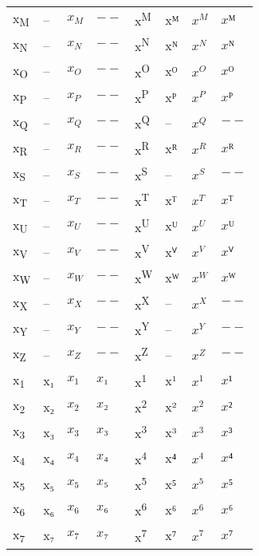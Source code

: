 \documentclass{standalone}
\begin{document}
\begin{tabular}{ll|ll|ll|ll}
x\textsubscript{M} & -- & $x_{M}$ & $--$ & x\textsuperscript{M} & xᴹ & $x^{M}$ & $xᴹ$ \\
x\textsubscript{N} & -- & $x_{N}$ & $--$ & x\textsuperscript{N} & xᴺ & $x^{N}$ & $xᴺ$ \\
x\textsubscript{O} & -- & $x_{O}$ & $--$ & x\textsuperscript{O} & xᴼ & $x^{O}$ & $xᴼ$ \\
x\textsubscript{P} & -- & $x_{P}$ & $--$ & x\textsuperscript{P} & xᴾ & $x^{P}$ & $xᴾ$ \\
x\textsubscript{Q} & -- & $x_{Q}$ & $--$ & x\textsuperscript{Q} & -- & $x^{Q}$ & $--$ \\
x\textsubscript{R} & -- & $x_{R}$ & $--$ & x\textsuperscript{R} & xᴿ & $x^{R}$ & $xᴿ$ \\
x\textsubscript{S} & -- & $x_{S}$ & $--$ & x\textsuperscript{S} & -- & $x^{S}$ & $--$ \\
x\textsubscript{T} & -- & $x_{T}$ & $--$ & x\textsuperscript{T} & xᵀ & $x^{T}$ & $xᵀ$ \\
x\textsubscript{U} & -- & $x_{U}$ & $--$ & x\textsuperscript{U} & xᵁ & $x^{U}$ & $xᵁ$ \\
x\textsubscript{V} & -- & $x_{V}$ & $--$ & x\textsuperscript{V} & xⱽ & $x^{V}$ & $xⱽ$ \\
x\textsubscript{W} & -- & $x_{W}$ & $--$ & x\textsuperscript{W} & xᵂ & $x^{W}$ & $xᵂ$ \\
x\textsubscript{X} & -- & $x_{X}$ & $--$ & x\textsuperscript{X} & -- & $x^{X}$ & $--$ \\
x\textsubscript{Y} & -- & $x_{Y}$ & $--$ & x\textsuperscript{Y} & -- & $x^{Y}$ & $--$ \\
x\textsubscript{Z} & -- & $x_{Z}$ & $--$ & x\textsuperscript{Z} & -- & $x^{Z}$ & $--$ \\
\midrule
x\textsubscript{1} & x₁ & $x_{1}$ & $x₁$ & x\textsuperscript{1} & x¹ & $x^{1}$ & $x¹$ \\
x\textsubscript{2} & x₂ & $x_{2}$ & $x₂$ & x\textsuperscript{2} & x² & $x^{2}$ & $x²$ \\
x\textsubscript{3} & x₃ & $x_{3}$ & $x₃$ & x\textsuperscript{3} & x³ & $x^{3}$ & $x³$ \\
x\textsubscript{4} & x₄ & $x_{4}$ & $x₄$ & x\textsuperscript{4} & x⁴ & $x^{4}$ & $x⁴$ \\
x\textsubscript{5} & x₅ & $x_{5}$ & $x₅$ & x\textsuperscript{5} & x⁵ & $x^{5}$ & $x⁵$ \\
x\textsubscript{6} & x₆ & $x_{6}$ & $x₆$ & x\textsuperscript{6} & x⁶ & $x^{6}$ & $x⁶$ \\
x\textsubscript{7} & x₇ & $x_{7}$ & $x₇$ & x\textsuperscript{7} & x⁷ & $x^{7}$ & $x⁷$ \\

\end{tabular}
\end{document}
